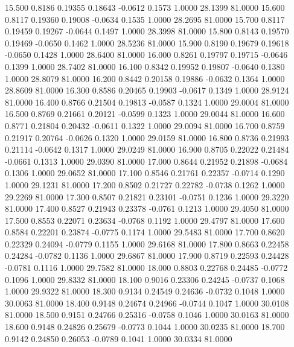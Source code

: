   15.500   0.8186   0.19355   0.18643  -0.0612   0.1573   1.0000  28.1399  81.0000
  15.600   0.8117   0.19360   0.19008  -0.0634   0.1535   1.0000  28.2695  81.0000
  15.700   0.8117   0.19459   0.19267  -0.0644   0.1497   1.0000  28.3998  81.0000
  15.800   0.8143   0.19570   0.19469  -0.0650   0.1462   1.0000  28.5236  81.0000
  15.900   0.8190   0.19679   0.19618  -0.0650   0.1428   1.0000  28.6400  81.0000
  16.000   0.8261   0.19797   0.19715  -0.0646   0.1399   1.0000  28.7402  81.0000
  16.100   0.8342   0.19952   0.19807  -0.0640   0.1380   1.0000  28.8079  81.0000
  16.200   0.8442   0.20158   0.19886  -0.0632   0.1364   1.0000  28.8609  81.0000
  16.300   0.8586   0.20465   0.19903  -0.0617   0.1349   1.0000  28.9124  81.0000
  16.400   0.8766   0.21504   0.19813  -0.0587   0.1324   1.0000  29.0004  81.0000
  16.500   0.8769   0.21661   0.20121  -0.0599   0.1323   1.0000  29.0044  81.0000
  16.600   0.8771   0.21804   0.20432  -0.0611   0.1322   1.0000  29.0094  81.0000
  16.700   0.8759   0.21917   0.20764  -0.0626   0.1320   1.0000  29.0159  81.0000
  16.800   0.8736   0.21993   0.21114  -0.0642   0.1317   1.0000  29.0249  81.0000
  16.900   0.8705   0.22022   0.21484  -0.0661   0.1313   1.0000  29.0390  81.0000
  17.000   0.8644   0.21952   0.21898  -0.0684   0.1306   1.0000  29.0652  81.0000
  17.100   0.8546   0.21761   0.22357  -0.0714   0.1290   1.0000  29.1231  81.0000
  17.200   0.8502   0.21727   0.22782  -0.0738   0.1262   1.0000  29.2269  81.0000
  17.300   0.8507   0.21821   0.23101  -0.0751   0.1236   1.0000  29.3220  81.0000
  17.400   0.8527   0.21943   0.23378  -0.0761   0.1213   1.0000  29.4050  81.0000
  17.500   0.8553   0.22071   0.23634  -0.0768   0.1192   1.0000  29.4797  81.0000
  17.600   0.8584   0.22201   0.23874  -0.0775   0.1174   1.0000  29.5483  81.0000
  17.700   0.8620   0.22329   0.24094  -0.0779   0.1155   1.0000  29.6168  81.0000
  17.800   0.8663   0.22458   0.24284  -0.0782   0.1136   1.0000  29.6867  81.0000
  17.900   0.8719   0.22593   0.24428  -0.0781   0.1116   1.0000  29.7582  81.0000
  18.000   0.8803   0.22768   0.24485  -0.0772   0.1096   1.0000  29.8332  81.0000
  18.100   0.9016   0.23306   0.24245  -0.0737   0.1068   1.0000  29.9322  81.0000
  18.300   0.9134   0.24549   0.24636  -0.0732   0.1048   1.0000  30.0063  81.0000
  18.400   0.9148   0.24674   0.24966  -0.0744   0.1047   1.0000  30.0108  81.0000
  18.500   0.9151   0.24766   0.25316  -0.0758   0.1046   1.0000  30.0163  81.0000
  18.600   0.9148   0.24826   0.25679  -0.0773   0.1044   1.0000  30.0235  81.0000
  18.700   0.9142   0.24850   0.26053  -0.0789   0.1041   1.0000  30.0334  81.0000
